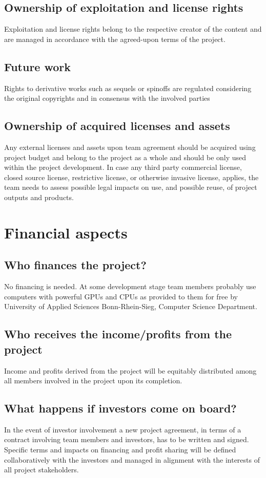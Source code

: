 \subsection{Ownership of exploitation and license rights}
Exploitation and license rights belong to the respective creator of the content and are managed in accordance with the agreed-upon terms of the project.
\subsection{Future work}
Rights to derivative works such as sequels or spinoffs are regulated considering the original copyrights and in consensus with the involved parties
\subsection{Ownership of acquired licenses and assets}
Any external licenses and assets upon team agreement should be acquired using project budget and belong to the project as a whole and should be only used within the project development.
In case any third party commercial license, closed source license, restrictive license, or otherwise invasive license, applies, the team needs to assess possible legal impacts on use, and possible reuse, of project outputs and products.

\section{Financial aspects}
\subsection{Who finances the project?}
No financing is needed.
At some development stage team members probably use computers with powerful GPUs and CPUs as provided to them for free by University of Applied Sciences Bonn-Rhein-Sieg, Computer Science Department.
\subsection{Who receives the income/profits from the project}
Income and profits derived from the project will be equitably distributed among all members involved in the project upon its completion.
\subsection{What happens if investors come on board?}
In the event of investor involvement a new project agreement, in terms of a contract involving team members and investors, has to be written and signed.
Specific terms and impacts on financing and profit sharing will be defined collaboratively with the investors and managed in alignment with the interests of all project stakeholders.
